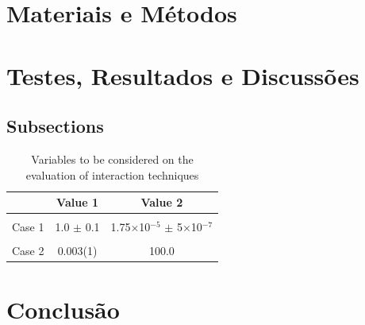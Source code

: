 \begin{document}

\section{Materiais e Métodos} \label{sec:mat_metodos}


\section{Testes, Resultados e Discussões} \label{sec:testes}


\subsection{Subsections}


\begin{table}[ht]
\centering
\caption{Variables to be considered on the evaluation of interaction
  techniques}
\label{tab:exTable1}
\smallskip
\begin{tabular}{|l|c|c|}
\hline
& Value 1 & Value 2\\[0.5ex]
\hline
&&\\[-2ex]
Case 1 & 1.0 $\pm$ 0.1 & 1.75$\times$10$^{-5}$ $\pm$ 5$\times$10$^{-7}$\\[0.5ex]
\hline
&&\\[-2ex]
Case 2 & 0.003(1) & 100.0\\[0.5ex]
\hline
\end{tabular}
\end{table}


\section{Conclusão} \label{sec:conclusao}




\end{document}
